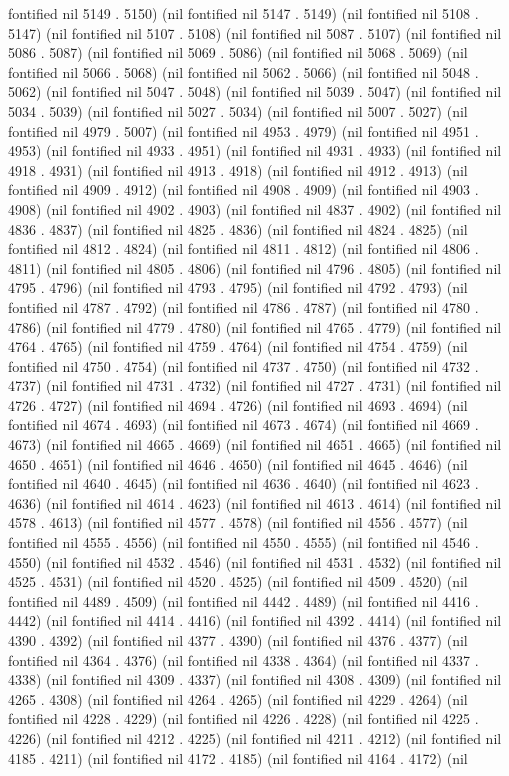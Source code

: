 fontified nil 5149 . 5150) (nil fontified nil 5147 . 5149) (nil fontified nil 5108 . 5147) (nil fontified nil 5107 . 5108) (nil fontified nil 5087 . 5107) (nil fontified nil 5086 . 5087) (nil fontified nil 5069 . 5086) (nil fontified nil 5068 . 5069) (nil fontified nil 5066 . 5068) (nil fontified nil 5062 . 5066) (nil fontified nil 5048 . 5062) (nil fontified nil 5047 . 5048) (nil fontified nil 5039 . 5047) (nil fontified nil 5034 . 5039) (nil fontified nil 5027 . 5034) (nil fontified nil 5007 . 5027) (nil fontified nil 4979 . 5007) (nil fontified nil 4953 . 4979) (nil fontified nil 4951 . 4953) (nil fontified nil 4933 . 4951) (nil fontified nil 4931 . 4933) (nil fontified nil 4918 . 4931) (nil fontified nil 4913 . 4918) (nil fontified nil 4912 . 4913) (nil fontified nil 4909 . 4912) (nil fontified nil 4908 . 4909) (nil fontified nil 4903 . 4908) (nil fontified nil 4902 . 4903) (nil fontified nil 4837 . 4902) (nil fontified nil 4836 . 4837) (nil fontified nil 4825 . 4836) (nil fontified nil 4824 . 4825) (nil fontified nil 4812 . 4824) (nil fontified nil 4811 . 4812) (nil fontified nil 4806 . 4811) (nil fontified nil 4805 . 4806) (nil fontified nil 4796 . 4805) (nil fontified nil 4795 . 4796) (nil fontified nil 4793 . 4795) (nil fontified nil 4792 . 4793) (nil fontified nil 4787 . 4792) (nil fontified nil 4786 . 4787) (nil fontified nil 4780 . 4786) (nil fontified nil 4779 . 4780) (nil fontified nil 4765 . 4779) (nil fontified nil 4764 . 4765) (nil fontified nil 4759 . 4764) (nil fontified nil 4754 . 4759) (nil fontified nil 4750 . 4754) (nil fontified nil 4737 . 4750) (nil fontified nil 4732 . 4737) (nil fontified nil 4731 . 4732) (nil fontified nil 4727 . 4731) (nil fontified nil 4726 . 4727) (nil fontified nil 4694 . 4726) (nil fontified nil 4693 . 4694) (nil fontified nil 4674 . 4693) (nil fontified nil 4673 . 4674) (nil fontified nil 4669 . 4673) (nil fontified nil 4665 . 4669) (nil fontified nil 4651 . 4665) (nil fontified nil 4650 . 4651) (nil fontified nil 4646 . 4650) (nil fontified nil 4645 . 4646) (nil fontified nil 4640 . 4645) (nil fontified nil 4636 . 4640) (nil fontified nil 4623 . 4636) (nil fontified nil 4614 . 4623) (nil fontified nil 4613 . 4614) (nil fontified nil 4578 . 4613) (nil fontified nil 4577 . 4578) (nil fontified nil 4556 . 4577) (nil fontified nil 4555 . 4556) (nil fontified nil 4550 . 4555) (nil fontified nil 4546 . 4550) (nil fontified nil 4532 . 4546) (nil fontified nil 4531 . 4532) (nil fontified nil 4525 . 4531) (nil fontified nil 4520 . 4525) (nil fontified nil 4509 . 4520) (nil fontified nil 4489 . 4509) (nil fontified nil 4442 . 4489) (nil fontified nil 4416 . 4442) (nil fontified nil 4414 . 4416) (nil fontified nil 4392 . 4414) (nil fontified nil 4390 . 4392) (nil fontified nil 4377 . 4390) (nil fontified nil 4376 . 4377) (nil fontified nil 4364 . 4376) (nil fontified nil 4338 . 4364) (nil fontified nil 4337 . 4338) (nil fontified nil 4309 . 4337) (nil fontified nil 4308 . 4309) (nil fontified nil 4265 . 4308) (nil fontified nil 4264 . 4265) (nil fontified nil 4229 . 4264) (nil fontified nil 4228 . 4229) (nil fontified nil 4226 . 4228) (nil fontified nil 4225 . 4226) (nil fontified nil 4212 . 4225) (nil fontified nil 4211 . 4212) (nil fontified nil 4185 . 4211) (nil fontified nil 4172 . 4185) (nil fontified nil 4164 . 4172) (nil 